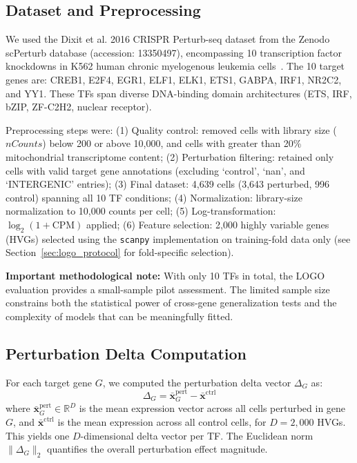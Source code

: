 \documentclass[12pt,number,sort&compress]{elsarticle}
\begin{document}
\subsection{Dataset and Preprocessing}
\label{sec:dataset}

We used the Dixit et al. 2016 CRISPR Perturb-seq dataset from the Zenodo
scPerturb database (accession: 13350497), encompassing 10 transcription factor
knockdowns in K562 human chronic myelogenous leukemia cells~\citep{Dixit2016PerturbSeq}.
The 10 target genes are: CREB1, E2F4, EGR1, ELF1, ELK1, ETS1, GABPA, IRF1,
NR2C2, and YY1. These TFs span diverse DNA-binding domain architectures
(ETS, IRF, bZIP, ZF-C2H2, nuclear receptor).

Preprocessing steps were: (1) Quality control: removed cells with library size
($nCounts$) below 200 or above 10,000, and cells with greater than 20\%
mitochondrial transcriptome content; (2) Perturbation filtering: retained only
cells with valid target gene annotations (excluding `control', `nan', and
`INTERGENIC' entries); (3) Final dataset: 4,639 cells (3,643 perturbed,
996 control) spanning all 10 TF conditions; (4) Normalization: library-size
normalization to 10,000 counts per cell; (5) Log-transformation:
$\log_2(1 + \text{CPM})$ applied; (6) Feature selection: 2,000 highly variable
genes (HVGs) selected using the \texttt{scanpy} implementation on training-fold
data only (see Section~\ref{sec:logo_protocol} for fold-specific selection).

\textbf{Important methodological note:} With only 10 TFs in total, the LOGO
evaluation provides a small-sample pilot assessment. The limited sample size
constrains both the statistical power of cross-gene generalization tests and
the complexity of models that can be meaningfully fitted.

\subsection{Perturbation Delta Computation}
\label{sec:delta}

For each target gene $G$, we computed the perturbation delta vector $\Delta_G$ as:
\begin{equation}
\Delta_G = \bar{\mathbf{x}}_G^{\text{pert}} - \bar{\mathbf{x}}^{\text{ctrl}}
\label{eq:delta}
\end{equation}
where $\bar{\mathbf{x}}_G^{\text{pert}} \in \mathbb{R}^D$ is the mean expression
vector across all cells perturbed in gene $G$, and $\bar{\mathbf{x}}^{\text{ctrl}}$
is the mean expression across all control cells, for $D = 2{,}000$ HVGs.
This yields one $D$-dimensional delta vector per TF. The Euclidean norm
$\|\Delta_G\|_2$ quantifies the overall perturbation effect magnitude.
\end{document}
